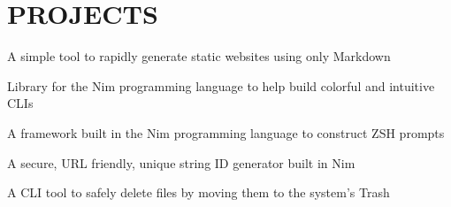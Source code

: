 \documentclass[]{resume-openfont}
\begin{document}
\begin{minipage}[t]{0.66\textwidth}

\section{PROJECTS}
A simple tool to rapidly generate static websites using only Markdown \\
\sectionsep

Library for the Nim programming language to help build colorful and intuitive CLIs
\sectionsep

A framework built in the Nim programming language to construct ZSH prompts
\sectionsep

A secure, URL friendly, unique string ID generator built in Nim
\sectionsep

A CLI tool to safely delete files by moving them to the system's Trash
\sectionsep

\end{minipage} 
\end{document}
